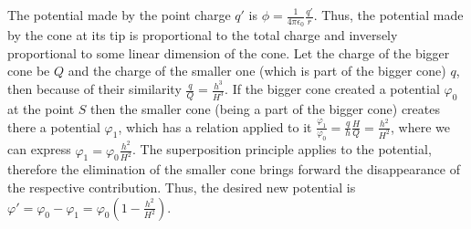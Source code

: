\solueng
The potential made by the point charge $q'$ is $\phi = \frac{1}{4 \pi \epsilon_0} \frac{q'}{r}$. Thus, the potential made by the cone at its tip is proportional to the total charge and inversely proportional to some linear dimension of the cone. Let the charge of the bigger cone be $Q$ and the charge of the smaller one (which is part of the bigger cone) $q$, then because of their similarity $\frac{q}{Q} = \frac{h^3}{H^3}$. If the bigger cone created a potential $\varphi_0$ at the point $S$ then the smaller cone (being a part of the bigger cone) creates there a potential $\varphi_1$, which has a relation applied to it $\frac{\varphi_1}{\varphi_0} = \frac{q}{h} \frac{H}{Q} = \frac{h^2}{H^2}$, where we can express $\varphi_1 = \varphi_0 \frac{h^2}{H^2}$. The superposition principle applies to the potential, therefore the elimination of the smaller cone brings forward the disappearance of the respective contribution. Thus, the desired new potential is $\varphi' = \varphi_0 - \varphi_1 = \varphi_0 ( 1 - \frac{h^2}{H^2})$.
\probend